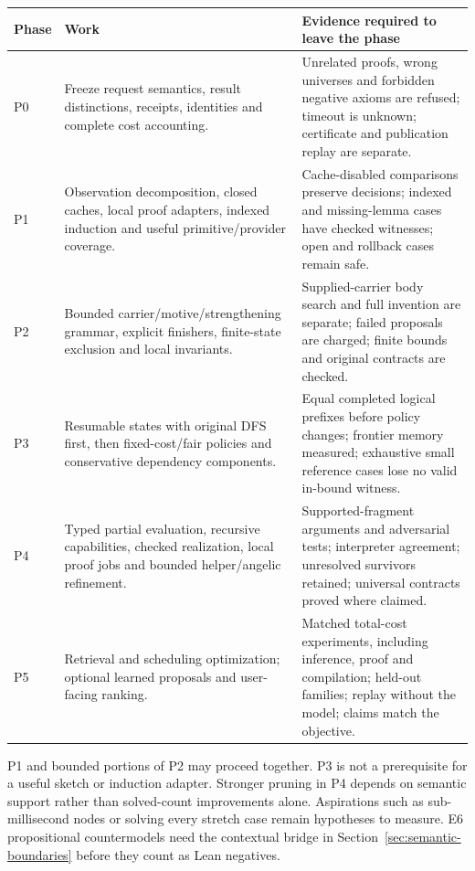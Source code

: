 \begin{longtable}{@{}L{12mm}L{59mm}L{77mm}@{}}
\toprule Phase & Work & Evidence required to leave the phase\\\midrule\endhead
P0 & Freeze request semantics, result distinctions, receipts, identities and complete cost accounting. & Unrelated proofs, wrong universes and forbidden negative axioms are refused; timeout is unknown; certificate and publication replay are separate.\\
P1 & Observation decomposition, closed caches, local proof adapters, indexed induction and useful primitive/provider coverage. & Cache-disabled comparisons preserve decisions; indexed and missing-lemma cases have checked witnesses; open and rollback cases remain safe.\\
P2 & Bounded carrier/motive/strengthening grammar, explicit finishers, finite-state exclusion and local invariants. & Supplied-carrier body search and full invention are separate; failed proposals are charged; finite bounds and original contracts are checked.\\
P3 & Resumable states with original DFS first, then fixed-cost/fair policies and conservative dependency components. & Equal completed logical prefixes before policy changes; frontier memory measured; exhaustive small reference cases lose no valid in-bound witness.\\
P4 & Typed partial evaluation, recursive capabilities, checked realization, local proof jobs and bounded helper/angelic refinement. & Supported-fragment arguments and adversarial tests; interpreter agreement; unresolved survivors retained; universal contracts proved where claimed.\\
P5 & Retrieval and scheduling optimization; optional learned proposals and user-facing ranking. & Matched total-cost experiments, including inference, proof and compilation; held-out families; replay without the model; claims match the objective.\\
\bottomrule
\end{longtable}

P1 and bounded portions of P2 may proceed together. P3 is not a prerequisite
for a useful sketch or induction adapter. Stronger pruning in P4 depends on
semantic support rather than solved-count improvements alone. Aspirations such
as sub-millisecond nodes or solving every stretch case remain hypotheses to
measure. E6 propositional countermodels need the contextual bridge in
Section~\ref{sec:semantic-boundaries} before they count as Lean negatives.

